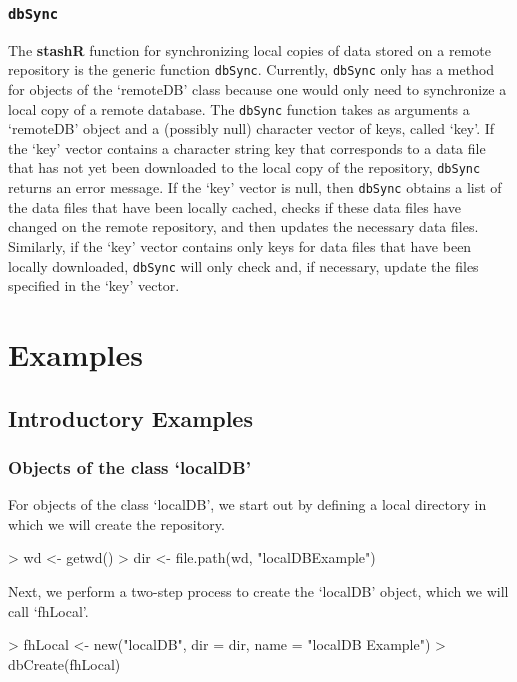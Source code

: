 \documentclass{article}
\newcommand{\pkg}{\textbf}
\newcommand{\code}{\texttt}
\begin{document}
\subsubsection{\code{dbSync}}\label{synch-interface}
The \pkg{stashR} function for synchronizing local copies
of data stored on a remote repository is the generic function
\code{dbSync}. Currently, \code{dbSync} only has a method for
objects of the `remoteDB' class because one would only need
to synchronize a local copy of a remote database. The
\code{dbSync} function takes as arguments a `remoteDB'
object and a (possibly null) character vector of keys, called
`key'. If the `key' vector contains a character string key that
corresponds to a data file that has not yet been downloaded to the
local copy of the repository, \code{dbSync} returns an error
message. If the `key' vector is null, then \code{dbSync} obtains a
list of the data files that have been locally cached, checks if
these data files have changed on the remote repository, and then
updates the necessary data files. Similarly, if the `key' vector
contains only keys for data files that have been locally
downloaded, \code{dbSync} will only check and, if necessary,
update the files specified in the `key' vector.


\section{Examples}

\subsection{Introductory Examples}

\subsubsection{Objects of the class `localDB'} 

For objects of the class `localDB', we start out by 
defining a local directory in which we will create the 
repository.

\begin{Schunk}
\begin{Sinput}
> wd <- getwd()
> dir <- file.path(wd, "localDBExample")
\end{Sinput}
\end{Schunk}

\noindent Next, we perform a two-step process to create the `localDB' object, 
which we will call `fhLocal'.
\begin{Schunk}
\begin{Sinput}
> fhLocal <- new("localDB", dir = dir, name = "localDB Example")
> dbCreate(fhLocal)
\end{Sinput}
\end{Schunk}
\end{document}
